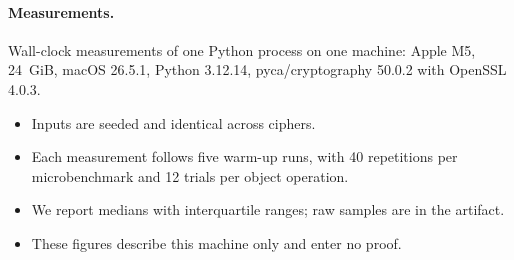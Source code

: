 \documentclass[pdflatex,sn-mathphys-num,twocolumn]{sn-jnl}
\theoremstyle{plain}
\theoremstyle{definition}
\begin{document}
\paragraph{Measurements.}
Wall-clock measurements of one Python process on one machine: Apple M5, 24~GiB, macOS 26.5.1, Python 3.12.14, pyca/cryptography 50.0.2 with OpenSSL 4.0.3.
\begin{itemize}
\item Inputs are seeded and identical across ciphers.
\item Each measurement follows five warm-up runs, with 40 repetitions per microbenchmark and 12 trials per object operation.
\item We report medians with interquartile ranges; raw samples are in the artifact.
\item These figures describe this machine only and enter no proof.
\end{itemize}
\end{document}
